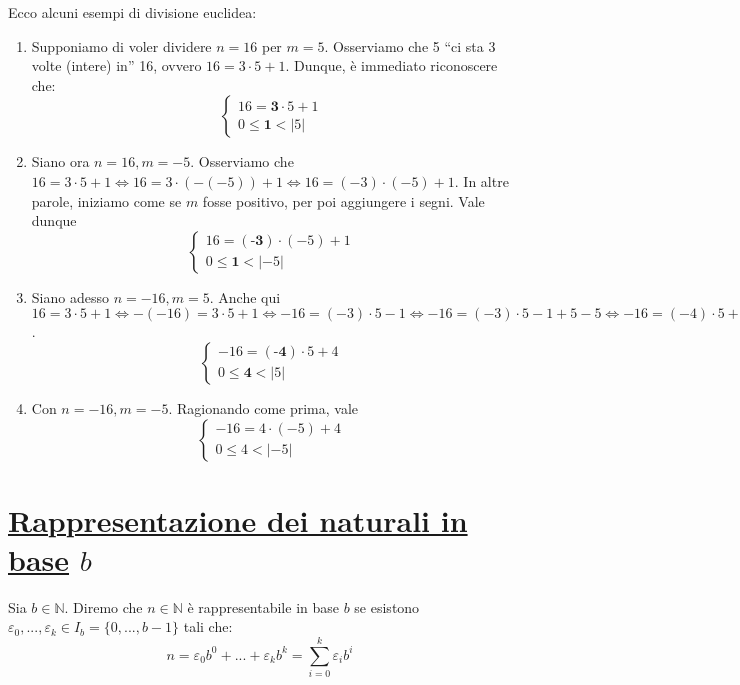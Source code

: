 \vspace*{10pt}
\begin{tcolorbox}[enhanced, breakable, colback=red!30, colframe=red!30!black, title=Algoritmo di divisione euclidea con segni differenti]
Ecco alcuni esempi di divisione euclidea:
\begin{enumerate}
    \item Supponiamo di voler dividere $n = 16$ per $m = 5$. Osserviamo che 5 ``ci sta 3 volte (intere) in'' 16,
    ovvero $16 = 3\cdot 5 + 1$. Dunque, è immediato riconoscere che:
    \[
        \begin{cases}
            16 = \textbf{3}\cdot 5 + 1\\
            0 \leq \textbf{1} < |5|
        \end{cases}
    \]

    \item Siano ora $n = 16, m = -5$. Osserviamo che $16 = 3\cdot 5 + 1 \Leftrightarrow 16 = 3\cdot(-(-5)) + 1 \Leftrightarrow 16 = (-3)\cdot(-5) + 1$.
    In altre parole, iniziamo come se $m$ fosse positivo, per poi aggiungere i segni. Vale dunque
    \[
        \begin{cases}
            16 = (\textbf{-3})\cdot(-5) + 1\\
            0 \leq \textbf{1} < |-5|
        \end{cases}
    \]

    \item Siano adesso $n = -16, m = 5$. Anche qui $16 = 3\cdot 5 + 1 \Leftrightarrow -(-16) = 3\cdot 5 + 1 \Leftrightarrow -16 = (-3)\cdot 5 - 1 \Leftrightarrow -16 = (-3)\cdot 5 - 1 + 5 - 5 \Leftrightarrow -16 = (-4)\cdot 5 + 4$.
    \[
        \begin{cases}
            -16 = (\textbf{-4})\cdot 5 + 4\\
            0 \leq \textbf{4} < |5|
        \end{cases}
    \]

    \item Con $n = -16, m = -5$. Ragionando come prima, vale
    \[
        \begin{cases}
            -16 = 4\cdot (-5) + 4\\
            0\leq 4 < |-5|
        \end{cases}
    \]
\end{enumerate}
\end{tcolorbox}

\section{\underline{Rappresentazione dei naturali in base} $b$}
\begin{tcolorbox}[colback=yellow!30, colframe=yellow!30!black, title=Rappresentabilità dei naturali in base arbitraria]
Sia $b\in\mathbb{N}$. Diremo che $n\in\mathbb{N}$ è rappresentabile in base $b$ se
esistono $\varepsilon_0,...,\varepsilon_k\in I_b=\{0,...,b-1\}$ tali che:
\[ n=\varepsilon_0b^0+...+\varepsilon_k b^k = \sum_{i=0}^{k}\varepsilon_ib^i \]
\end{tcolorbox}

